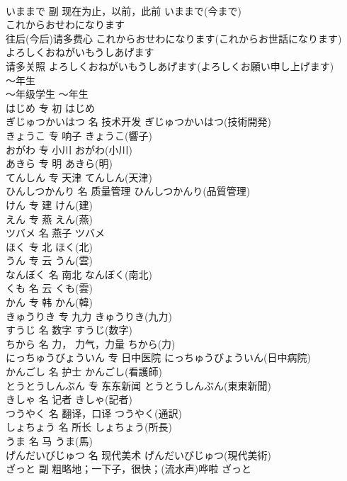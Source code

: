 \documentclass[8pt]{extreport}
\begin{document}
\begin{CJK}{UTF8}{min}
\\	いままで	副	现在为止，以前，此前	いままで(今まで)	
\\	これからおせわになります	
\\	往后(今后)请多费心	これからおせわになります(これからお世話になります)	
\\	よろしくおねがいもうしあげます	
\\	请多关照	よろしくおねがいもうしあげます(よろしくお願い申し上げます)	
\\	～年生	
\\	～年级学生	～年生	
\\	はじめ	专	初	はじめ	
\\	ぎじゅつかいはつ	名	技术开发	ぎじゅつかいはつ(技術開発)	
\\	きょうこ	专	响子	きょうこ(響子)	
\\	おがわ	专	小川	おがわ(小川)	
\\	あきら	专	明	あきら(明)	
\\	てんしん	专	天津	てんしん(天津)	
\\	ひんしつかんり	名	质量管理	ひんしつかんり(品質管理)	
\\	けん	专	建	けん(建)	
\\	えん	专	燕	えん(燕)	
\\	ツバメ	名	燕子	ツバメ	
\\	ほく	专	北	ほく(北)	
\\	うん	专	云	うん(雲)	
\\	なんぼく	名	南北	なんぼく(南北)	
\\	くも	名	云	くも(雲)	
\\	かん	专	韩	かん(韓)	
\\	きゅうりき	专	九力	きゅうりき(九力)	
\\	すうじ	名	数字	すうじ(数字)	
\\	ちから	名	力， 力气，力量	ちから(力)	
\\	にっちゅうびょういん	专	日中医院	にっちゅうびょういん(日中病院)	
\\	かんごし	名	护士	かんごし(看護師)	
\\	とうとうしんぶん	专	东东新闻	とうとうしんぶん(東東新聞)	
\\	きしゃ	名	记者	きしゃ(記者)	
\\	つうやく	名	翻译，口译	つうやく(通訳)	
\\	しょちょう	名	所长	しょちょう(所長)	
\\	うま	名	马	うま(馬)	
\\	げんだいびじゅつ	名	现代美术	げんだいびじゅつ(現代美術)	
\\	ざっと	副	粗略地；一下子，很快；(流水声)哗啦	ざっと	

\end{CJK}
\end{document}
